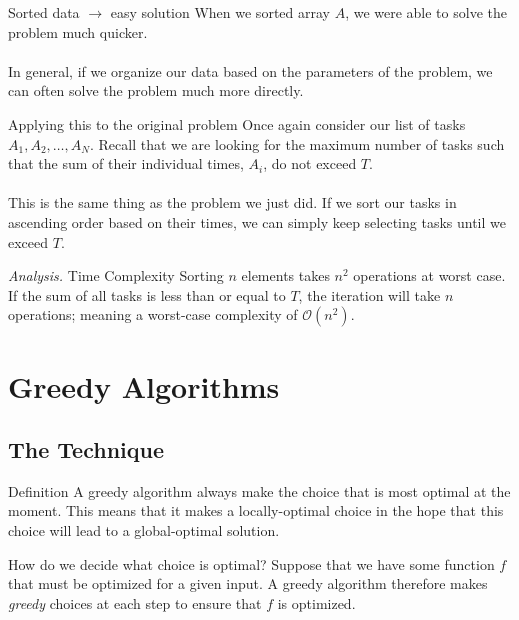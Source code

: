 \documentclass{beamer}
\begin{document}
\begin{frame}{Sorted data $\rightarrow$ easy solution}
    When we sorted array $A$, we were able to solve the problem much quicker.\\~\\
    
    In general, if we organize our data based on the parameters of the problem, we can often solve the problem much more directly.
\end{frame}

\begin{frame}{Applying this to the original problem}
    Once again consider our list of tasks $A_1,A_2,\ldots,A_N$. Recall that we are looking for the maximum number of tasks such that the sum of their individual times, $A_i$, do not exceed $T$.\\~\\
    This is the same thing as the problem we just did. If we sort our tasks in ascending order based on their times, we can simply keep selecting tasks until we exceed $T$.
    \begin{block}{\textit{Analysis.} Time Complexity}
        Sorting $n$ elements takes $n^2$ operations at worst case. If the sum of all tasks is less than or equal to $T$, the iteration will take $n$ operations; meaning a worst-case complexity of $\mathcal{O}(n^2)$.
    \end{block}
\end{frame}

\section{Greedy Algorithms}
\subsection{The Technique}
\begin{frame}{Definition}
    A greedy algorithm always make the choice that is most optimal at the moment. This means that it makes a locally-optimal choice in the hope that this choice will lead to a global-optimal solution.
\end{frame}

\begin{frame}{How do we decide what choice is optimal?}
    Suppose that we have some function $f$ that must be optimized for a given input. A greedy algorithm therefore makes \textit{greedy} choices at each step to ensure that $f$ is optimized. 
\end{frame}
\end{document}

